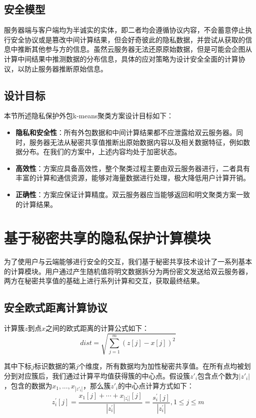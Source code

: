 \subsection{安全模型}
服务器端与客户端均为半诚实的实体，即二者均会遵循协议内容，不会蓄意停止执行安全协议或是篡改中间计算结果，但会好奇彼此的隐私数据，并尝试从获取的信息中推断其他参与方的信息。虽然云服务器无法还原原始数据，但是可能会企图从计算中间结果中推测数据的分布信息，具体的应对策略为设计安全全面的计算协议，以防止服务器推断原始信息。
\subsection{设计目标}
本节所述隐私保护外包k-means聚类方案设计目标如下：
\begin{itemize}
	\item \textbf{隐私和安全性}：所有外包数据和中间计算结果都不应泄露给双云服务器。同时，服务器无法从秘密共享值推断出原始数据内容以及相关数据特征，例如数据分布。在我们的方案中，上述内容均处于加密状态。
	\item \textbf{高效性}：方案应具备高效性，整个聚类过程主要由双云服务器进行，二者具有丰富的计算和通信资源，能够对海量数据进行处理，极大降低用户计算开销。
	\item \textbf{正确性}：方案应保证计算精度。双云服务器应当能够返回和明文聚类方案一致的计算结果。
\end{itemize}
\section{基于秘密共享的隐私保护计算模块}
\label{s3-mokuai}
为了使用户与云端能够进行安全的交互，我们基于秘密共享技术设计了一系列基本的计算模块。用户通过产生随机值将明文数据拆分为两份密文发送给双云服务器，两方在秘密共享值的基础上进行系列计算和交互，获取最终结果。

\subsection{安全欧式距离计算协议}

计算簇$z$到点$x$之间的欧式距离的计算公式如下：
\begin{equation}
    \label{cal_dist}
    dist=\sqrt{\sum_{j=1}^m\left(z[j]-x[j]\right)^2}
\end{equation}

其中下标$j$标识数据的第$j$个维度，所有数据均为加性秘密共享值。在所有点均被划分到对应簇后，我们通过计算平均值获得簇的中心点。假设簇$z'_i$包含点个数为$|z'_i|$，包含的数据为${x_1,...,x_{|z'_i|}}$，那么簇$z'_i$的中心点计算方式如下：
\begin{equation}
    \label{cal_center}
    z_{i}^{\prime}[j]=\frac{x_{1}[j]+\cdots+x_{\left|z_{i}^{\prime}\right|}[j]}{\left|z_{i}^{\prime}\right|}=\frac{s_{i}^{\prime}[j]}{\left|z_{i}^{\prime}\right|}, 1 \leq j \leq m
\end{equation}

